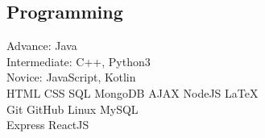 \documentclass[]{resume-openfont}
\begin{document}
\begin{minipage}[t]{0.33\textwidth}
\subsection{Programming}
\textbullet{} Advance: Java\\
\textbullet{} Intermediate: C++, Python3\\
\textbullet{} Novice: JavaScript, Kotlin\\
\textbullet{} HTML \textbullet{} CSS \textbullet{} SQL  \textbullet{} MongoDB \textbullet{} AJAX \textbullet{} NodeJS \textbullet{} \LaTeX \\
\textbullet{} Git \textbullet{} GitHub \textbullet{} Linux   \textbullet{} MySQL \\
\textbullet{} Express \textbullet{} ReactJS \\
\sectionsep

%
%

\end{minipage} 
\hfill
\end{document}
